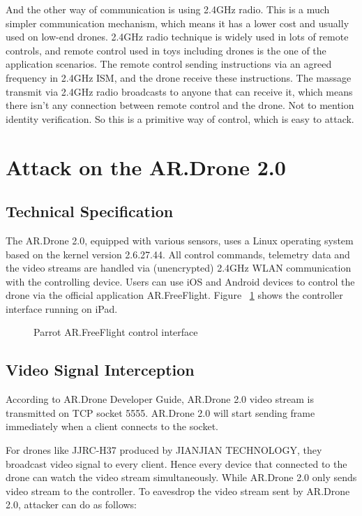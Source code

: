 \documentclass{acm_proc_article-sp}
\newcommand{\upcite}[1]{\textsuperscript{\textsuperscript{\cite{#1}}}}
\begin{document}
 
 And the other way of communication is using 2.4GHz radio. This is a much simpler communication mechanism, which means it has a lower cost and usually used on low-end drones. 2.4GHz radio technique is widely used in lots of remote controls, and remote control used in toys including drones is the one of the application scenarios. The remote control sending instructions via an agreed frequency in 2.4GHz ISM, and the drone receive these instructions. The massage transmit via 2.4GHz radio broadcasts to anyone that can receive it, which means there isn't any connection between remote control and the drone. Not to mention identity verification. So this is a primitive way of control, which is easy to attack.

\section{Attack on the AR.Drone 2.0}

\subsection{Technical Specification}
The AR.Drone 2.0, equipped with various sensors, uses a Linux operating system based on the kernel version 2.6.27.44. All control commands, telemetry data and the video streams are handled via (unencrypted) 2.4GHz WLAN communication with the controlling device. Users can use iOS and Android devices to control the drone via the official application AR.FreeFlight. Figure ~\ref{iPad} shows the controller interface running on iPad.

\begin{figure}
\centering
{}
\caption{Parrot AR.FreeFlight control interface}
\label{iPad}
\end{figure}

\subsection{Video Signal Interception}

According to AR.Drone Developer Guide\upcite{dev:guide}, AR.Drone 2.0 video stream is transmitted on TCP socket 5555. AR.Drone 2.0 will start sending frame immediately when a client connects to the socket. 

For drones like JJRC-H37 produced by JIANJIAN TECHNOLOGY, they broadcast video signal to every client. Hence every device that connected to the drone can watch the video stream simultaneously. While AR.Drone 2.0 only sends video stream to the controller. To eavesdrop the video stream sent by AR.Drone 2.0, attacker can do as follows:
\end{document}
